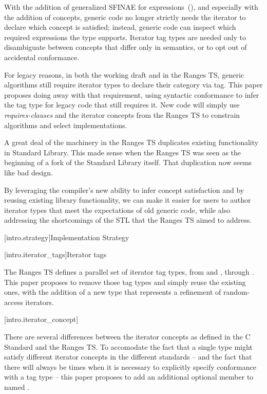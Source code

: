 \pnum
With the addition of generalized SFINAE for expressions~(\cite{expr-sfinae}),
and especially with the addition of concepts, generic code no longer strictly
needs the iterator to declare which concept is satisfied; instead, generic
code can inspect which required expressions the type supports. Iterator tag types
are needed only to disambiguate between concepts that differ only in semantics,
or to opt out of accidental conformance.

\pnum
For legacy reasons, in both the working draft and in the Ranges TS, generic
algorithms still require iterator types to declare their category via tag. This
paper proposes doing away with that requirement, using syntactic conformance to
infer the tag type for legacy code that still requires it. New code will simply
use \textit{requires-clauses} and the iterator concepts from the Ranges TS to
constrain algorithms and select implementations.

\pnum
A great deal of the machinery in the Ranges TS duplicates existing functionality
in Standard Library. This made sense when the Ranges TS was seen as the
beginning of a fork of the Standard Library itself. That duplication now seems
like bad design.

\pnum
By leveraging the compiler's new ability to infer concept satisfaction and by
reusing existing library functionality, we can make it easier for users to author
iterator types that meet the expectations of old generic code, while also
addressing the shortcomings of the STL that the Ranges TS aimed to address.

[intro.strategy]{Implementation Strategy}

[intro.iterator_tags]{Iterator tags}

\pnum
The Ranges TS defines a parallel set of iterator tag types, from
 and , through
. This paper proposes to remove those
tag types and simply reuse the existing ones, with the addition of a new
 type that represents a refinement of
random-access iterators.

[intro.iterator_concept]{}

\pnum
There are several differences between the iterator concepts as defined in the
C\Rplus\Rplus\xspace Standard and the Ranges TS. To accomodate the
fact that a single type might satisfy different iterator concepts in the
different standards -- and the fact that there will always be times when it is
necessary to explicitly specify conformance with a tag type -- this paper
proposes to add an additional optional member to 
named .

